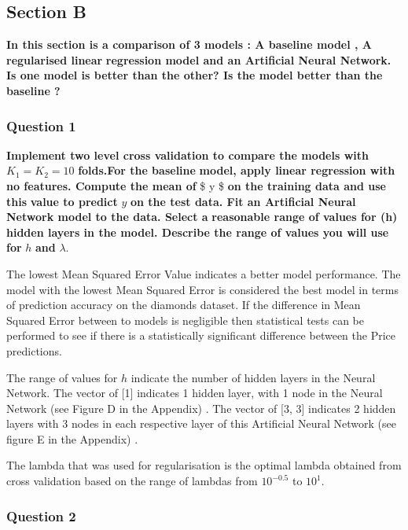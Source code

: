 \documentclass[
]{article}
\begin{document}
\hypertarget{section-b}{%
\subsection{Section B}\label{section-b}}

\textbf{In this section is a comparison of 3 models : A baseline model ,
A regularised linear} \textbf{regression model and an Artificial Neural
Network.} \textbf{Is one model is better than the other? Is the model
better than the baseline ?}

\hypertarget{question-1-1}{%
\subsubsection{Question 1}\label{question-1-1}}

\textbf{Implement two level cross validation to compare the models with}
\(K_{1} = K_{2} = 10\) \textbf{folds.For the baseline} \textbf{model,
apply linear regression with no features. Compute the mean of }\$ y \$
\textbf{on the training data and use this} \textbf{value to predict}
\(y\) \textbf{on the test data. Fit an Artificial Neural Network model
to the data. Select a} \textbf{reasonable range of values for (h) hidden
layers in the model. Describe the range of values you will use}
\textbf{for }\(h\) \textbf{and }\(\lambda\).

The lowest Mean Squared Error Value indicates a better model
performance. The model with the lowest Mean Squared Error is considered
the best model in terms of prediction accuracy on the diamonds dataset.
If the difference in Mean Squared Error between to models is negligible
then statistical tests can be performed to see if there is a
statistically significant difference between the Price predictions.

The range of values for \(h\) indicate the number of hidden layers in
the Neural Network. The vector of {[}1{]} indicates 1 hidden layer, with
1 node in the Neural Network (see Figure D in the Appendix) . The vector
of {[}3, 3{]} indicates 2 hidden layers with 3 nodes in each respective
layer of this Artificial Neural Network (see figure E in the Appendix) .

The lambda that was used for regularisation is the optimal lambda
obtained from cross validation based on the range of lambdas from
\(10^{-0.5}\) to \(10^1\).

\hypertarget{question-2-1}{%
\subsubsection{Question 2}\label{question-2-1}}
\end{document}
